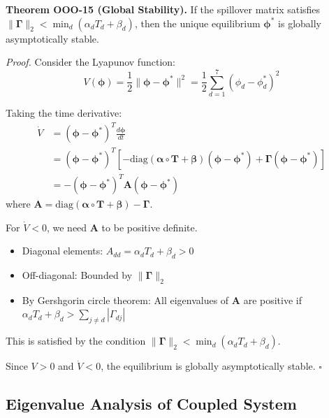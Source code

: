 \begin{tcolorbox}[colback=green!5!white, colframe=green!75!black, title=Theorem OOO-15: Global Asymptotic Stability]
\textbf{Theorem OOO-15 (Global Stability).}
If the spillover matrix satisfies $\|\boldsymbol{\Gamma}\|_2 < \min_d(\alpha_d T_d + \beta_d)$,
then the unique equilibrium $\boldsymbol{\phi}^*$ is globally asymptotically stable.

\textit{Proof.}
Consider the Lyapunov function:
\begin{equation}
V(\boldsymbol{\phi}) = \frac{1}{2} \|\boldsymbol{\phi} - \boldsymbol{\phi}^*\|^2 = \frac{1}{2} \sum_{d=1}^{7} (\phi_d - \phi_d^*)^2
\end{equation}

Taking the time derivative:
\begin{align}
\dot{V} &= (\boldsymbol{\phi} - \boldsymbol{\phi}^*)^T \frac{d\boldsymbol{\phi}}{dt} \\
&= (\boldsymbol{\phi} - \boldsymbol{\phi}^*)^T \left[-\text{diag}(\boldsymbol{\alpha} \circ \mathbf{T} + \boldsymbol{\beta})(\boldsymbol{\phi} - \boldsymbol{\phi}^*) + \boldsymbol{\Gamma}(\boldsymbol{\phi} - \boldsymbol{\phi}^*)\right] \\
&= -(\boldsymbol{\phi} - \boldsymbol{\phi}^*)^T \mathbf{A} (\boldsymbol{\phi} - \boldsymbol{\phi}^*)
\end{align}
where $\mathbf{A} = \text{diag}(\boldsymbol{\alpha} \circ \mathbf{T} + \boldsymbol{\beta}) - \boldsymbol{\Gamma}$.

For $\dot{V} < 0$, we need $\mathbf{A}$ to be positive definite.
\begin{itemize}[nosep]
\item Diagonal elements: $A_{dd} = \alpha_d T_d + \beta_d > 0$
\item Off-diagonal: Bounded by $\|\boldsymbol{\Gamma}\|_2$
\item By Gershgorin circle theorem: All eigenvalues of $\mathbf{A}$ are positive if
      $\alpha_d T_d + \beta_d > \sum_{j \neq d} |\Gamma_{dj}|$
\end{itemize}
This is satisfied by the condition $\|\boldsymbol{\Gamma}\|_2 < \min_d(\alpha_d T_d + \beta_d)$.

Since $V > 0$ and $\dot{V} < 0$, the equilibrium is globally asymptotically stable.
\hfill $\square$
\end{tcolorbox}

\subsection{Eigenvalue Analysis of Coupled System}

